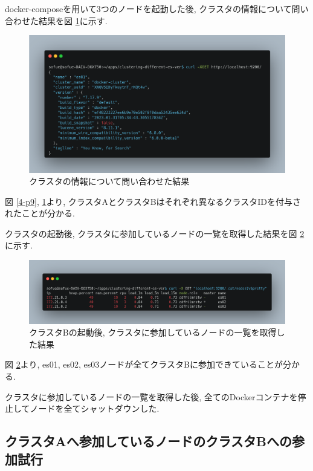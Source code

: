 docker-composeを用いて3つのノードを起動した後, クラスタの情報について問い合わせた結果を図 \ref{4-p11}に示す.

\begin{figure}
  \begin{center}
    \includegraphics[width=120mm]{sotu/figure/3nodes-cluster.png}
    \caption{クラスタの情報について問い合わせた結果}
    \label{4-p11}
  \end{center}
\end{figure}

図 \ref{4-p9}, \ref{4-p11}より, クラスタAとクラスタBはそれぞれ異なるクラスタIDを付与されたことが分かる.

クラスタの起動後, クラスタに参加しているノードの一覧を取得した結果を図 \ref{4-p12}に示す.

\begin{figure}
  \begin{center}
    \includegraphics[width=120mm]{sotu/figure/3nodes-list.png}
    \caption{クラスタBの起動後, クラスタに参加しているノードの一覧を取得した結果}
    \label{4-p12}
  \end{center}
\end{figure}

図 \ref{4-p12}より, es01, es02, es03ノードが全てクラスタBに参加できていることが分かる.

クラスタに参加しているノードの一覧を取得した後, 全てのDockerコンテナを停止してノードを全てシャットダウンした.

\subsection{クラスタAへ参加しているノードのクラスタBへの参加試行}

